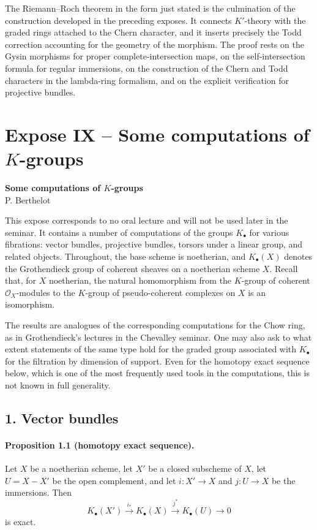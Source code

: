 \documentclass[12pt]{article}
\newcommand{\cO}{\mathcal O}
\newcommand{\xto}[1]{\xrightarrow{#1}}
\newcommand{\longto}{\longrightarrow}
\begin{document}
The Riemann--Roch theorem in the form just stated is the culmination of the construction developed in the preceding exposes. It connects $K'$-theory with the graded rings attached to the Chern character, and it inserts precisely the Todd correction accounting for the geometry of the morphism. The proof rests on the Gysin morphisms for proper complete-intersection maps, on the self-intersection formula for regular immersions, on the construction of the Chern and Todd characters in the lambda-ring formalism, and on the explicit verification for projective bundles.

\section*{Expose IX -- Some computations of $K$-groups}

\begin{center}
{\large\textbf{Some computations of $K$-groups}}\\[0.25em]
{\normalsize P. Berthelot}
\end{center}

This expose corresponds to no oral lecture and will not be used later in the seminar. It contains a number of computations of the groups $K_\bullet$ for various fibrations: vector bundles, projective bundles, torsors under a linear group, and related objects. Throughout, the base scheme is noetherian, and $K_\bullet(X)$ denotes the Grothendieck group of coherent sheaves on a noetherian scheme $X$. Recall that, for $X$ noetherian, the natural homomorphism from the $K$-group of coherent $\cO_X$-modules to the $K$-group of pseudo-coherent complexes on $X$ is an isomorphism.

The results are analogues of the corresponding computations for the Chow ring, as in Grothendieck's lectures in the Chevalley seminar. One may also ask to what extent statements of the same type hold for the graded group associated with $K_\bullet$ for the filtration by dimension of support. Even for the homotopy exact sequence below, which is one of the most frequently used tools in the computations, this is not known in full generality.

\subsection*{1. Vector bundles}

\paragraph{Proposition 1.1 (homotopy exact sequence).}
Let $X$ be a noetherian scheme, let $X'$ be a closed subscheme of $X$, let $U=X-X'$ be the open complement, and let $i:X'\to X$ and $j:U\to X$ be the immersions. Then
\[
K_\bullet(X')\xto{\,i_*\,}K_\bullet(X)\xto{\,j^*\,}K_\bullet(U)\longto0
\]
is exact.
\end{document}
